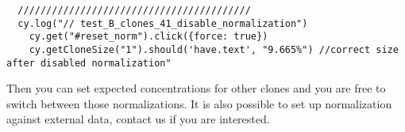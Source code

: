 \begin{verbatim}
  /////////////////////////////////////////
  cy.log("// test_B_clones_41_disable_normalization")
    cy.get("#reset_norm").click({force: true})
    cy.getCloneSize("1").should('have.text', "9.665%") //correct size after disabled normalization"

\end{verbatim}

Then you can set expected concentrations for other clones and you are free to
switch between those normalizations.
It is also possible to set up normalization against external data,
contact us if you are interested.

